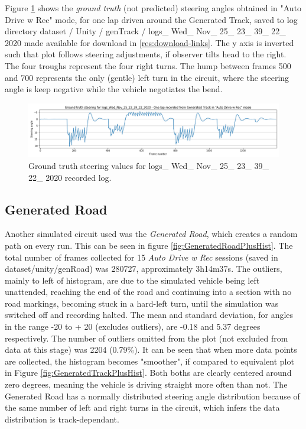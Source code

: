 Figure \ref{fig:genTrackOneLap_logs_Wed_Nov_25_23_39_22_2020_ground_truth_steering_angles} shows the \textit{ground truth} (not predicted) steering angles obtained in "Auto Drive w Rec" mode, for one lap driven around the Generated Track, saved to log directory dataset / Unity / genTrack / logs\_ Wed\_ Nov\_ 25\_ 23\_ 39\_ 22\_ 2020 made available for download in \ref{res:download-links}. The y axis is inverted such that plot follows steering adjustments, if observer tilts head to the right. The four troughs  represent the four right turns. The hump between frames 500 and 700 represents the only (gentle) left turn in the circuit, where the steering angle is keep negative while the vehicle negotiates the bend.

\begin{figure}[ht]
 \centering 
 \includegraphics[width=\textwidth]{Figures/genTrackOneLap_logs_Wed_Nov_25_23_39_22_2020_ground_truth_steering_angles.png}
 \caption{Ground truth steering values for logs\_ Wed\_ Nov\_ 25\_ 23\_ 39\_ 22\_ 2020 recorded log.}
 \label{fig:genTrackOneLap_logs_Wed_Nov_25_23_39_22_2020_ground_truth_steering_angles} 
\end{figure}

\subsection{Generated Road}
Another simulated circuit used was the \textit{Generated Road}, which creates a random path on every run. This can be seen in figure \ref{fig:GeneratedRoadPlusHist}. The total number of frames collected for 15 \textit{Auto Drive w Rec} sessions (saved in dataset/unity/genRoad) was 280727, approximately 3h14m37s. The outliers, mainly to left of histogram, are due to the simulated vehicle being left unattended, reaching the end of the road and continuing into a section with no road markings, becoming stuck in a hard-left turn, until the simulation was switched off and recording halted. The mean and standard deviation, for angles in the range -20 to + 20 (excludes outliers), are -0.18 and 5.37 degrees respectively. The number of outliers omitted from the plot (not excluded from data at this stage) was 2204 (0.79\%). It can be seen that when more data points are collected, the histogram becomes "smoother", if compared to equivalent plot in Figure  \ref{fig:GeneratedTrackPlusHist}.
Both boths are clearly centered around zero degrees, meaning the vehicle is driving straight more often than not. The Generated Road has a normally distributed steering angle distribution because of the same number of left and right turns in the circuit, which infers the data distribution is track-dependant.

